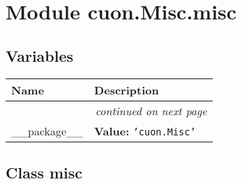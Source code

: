 %
%
%


\section{Module cuon.Misc.misc}

    \label{cuon:Misc:misc}


  \subsection{Variables}

    \vspace{-1cm}
\hspace{\varindent}\begin{longtable}{|p{\varnamewidth}|p{\vardescrwidth}|l}
\cline{1-2}
\cline{1-2} \centering \textbf{Name} & \centering \textbf{Description}& \\
\cline{1-2}
\endhead\cline{1-2}\multicolumn{3}{r}{\small\textit{continued on next page}}\\\endfoot\cline{1-2}
\endlastfoot\raggedright \_\-\_\-p\-a\-c\-k\-a\-g\-e\-\_\-\_\- & \raggedright \textbf{Value:} 
{\tt \texttt{'}\texttt{cuon.Misc}\texttt{'}}&\\
\cline{1-2}
\end{longtable}



\subsection{Class misc}

